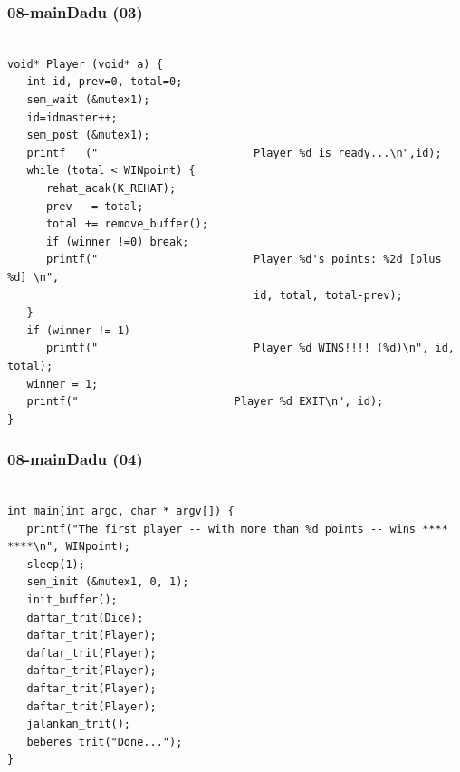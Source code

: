 \documentclass[aspectratio=169, xcolor=table, notheorems, hyperref={pdfpagelabels=false}]{beamer}
\begin{document}
\begin{frame}[fragile]
\frametitle{08-mainDadu (03)}
\begin{lstlisting}[basicstyle=\ttfamily\tiny]

void* Player (void* a) {
   int id, prev=0, total=0;
   sem_wait (&mutex1);
   id=idmaster++;
   sem_post (&mutex1);
   printf   ("                        Player %d is ready...\n",id);
   while (total < WINpoint) {
      rehat_acak(K_REHAT);
      prev   = total;
      total += remove_buffer();
      if (winner !=0) break;
      printf("                        Player %d's points: %2d [plus %d] \n", 
                                      id, total, total-prev);
   }
   if (winner != 1)
      printf("                        Player %d WINS!!!! (%d)\n", id, total);
   winner = 1;
   printf("                        Player %d EXIT\n", id);
}

\end{lstlisting}
\end{frame}

\begin{frame}[fragile]
\frametitle{08-mainDadu (04)}
\begin{lstlisting}[basicstyle=\ttfamily\tiny]

int main(int argc, char * argv[]) {
   printf("The first player -- with more than %d points -- wins **** ****\n", WINpoint);
   sleep(1);
   sem_init (&mutex1, 0, 1);
   init_buffer();
   daftar_trit(Dice);
   daftar_trit(Player);
   daftar_trit(Player);
   daftar_trit(Player);
   daftar_trit(Player);
   daftar_trit(Player);
   jalankan_trit();
   beberes_trit("Done...");
}


\end{lstlisting}
\end{frame}
\end{document}
